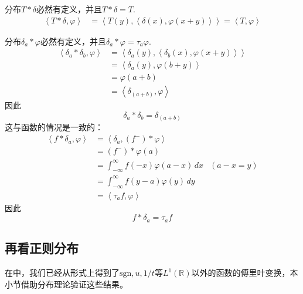 \begin{example}[与$\delta$卷积]
    分布$T*\delta$必然有定义，并且$T*\delta=T$.
\begin{align*}
    \left\langle T*\delta,\varphi\right\rangle & =\left\langle T(y),\left\langle \delta(x),\varphi(x+y)\right\rangle\right\rangle=\left\langle T,\varphi\right\rangle
\end{align*}
\end{example}

\begin{example}
    分布$\delta_a*\varphi$必然有定义，并且$\delta_a*\varphi=\tau_a \varphi$.
    \begin{align*}
    \left\langle \delta_a*\delta_b,\varphi\right\rangle & =\left\langle \delta_a(y),\left\langle\delta_b(x),\varphi(x+y)\right\rangle\right\rangle \\
                                             & =\left\langle \delta_a(y),\varphi(b+y)\right\rangle                    \\
                                             & =\varphi(a+b)                                               \\
                                             & =\left\langle\delta_{(a+b)},\varphi\right\rangle
\end{align*}
因此\[\delta_a*\delta_b=\delta_{(a+b)}\]
这与函数的情况是一致的：\begin{align*}
    \left\langle f*\delta_a,\varphi\right\rangle & =\left\langle \delta_a,(f^-)*\varphi\right\rangle                  \\
                                      & =(f^-)*\varphi(a)                                       \\
                                      & =\int_{-\infty}^{\infty}f(-x)\varphi(a-x)\,dx & (a-x=y) \\
                                      & =\int_{-\infty}^{\infty}f(y-a)\varphi(y)\,dy\\
                                      &=\left\langle \tau_a f,\varphi\right\rangle
\end{align*}
因此\[f*\delta_a=\tau_a f\]
\end{example}

\subsection{再看正则分布}\label{sub:normal_distribution}

在中，我们已经从形式上得到了$\mathrm{sgn},u,1/t$等$L^1(\mathbb{R})$以外的函数的傅里叶变换，本小节借助分布理论验证这些结果。

